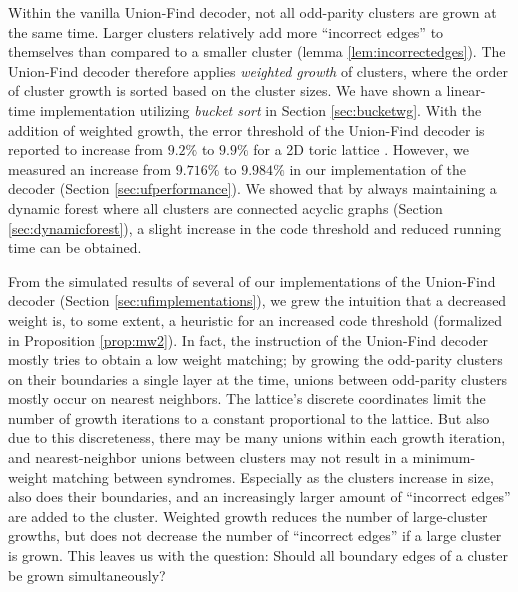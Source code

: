 Within the vanilla Union-Find decoder, not all odd-parity clusters are grown at the same time. Larger clusters relatively add more ``incorrect edges'' to themselves than compared to a smaller cluster (lemma \ref{lem:incorrectedges}). The Union-Find decoder therefore applies \emph{weighted growth} of clusters, where the order of cluster growth is sorted based on the cluster sizes. We have shown a linear-time implementation utilizing \emph{bucket sort} in Section \ref{sec:bucketwg}. With the addition of weighted growth, the error threshold of the Union-Find decoder is reported to increase from $9.2\%$ to $9.9\%$ for a 2D toric lattice \cite{delfosse2017almost}. However, we measured an increase from $9.716\%$ to $9.984\%$ in our implementation of the decoder (Section \ref{sec:ufperformance}). We showed that by always maintaining a dynamic forest where all clusters are connected acyclic graphs (Section \ref{sec:dynamicforest}), a slight increase in the code threshold and reduced running time can be obtained. 

From the simulated results of several of our implementations of the Union-Find decoder (Section \ref{sec:ufimplementations}), we grew the intuition that a decreased weight is, to some extent, a heuristic for an increased code threshold (formalized in Proposition \ref{prop:mw2}). In fact, the instruction of the Union-Find decoder mostly tries to obtain a low weight matching; by growing the odd-parity clusters on their boundaries a single layer at the time, unions between odd-parity clusters mostly occur on nearest neighbors. The lattice's discrete coordinates limit the number of growth iterations to a constant proportional to the lattice. But also due to this discreteness, there may be many unions within each growth iteration, and nearest-neighbor unions between clusters may not result in a minimum-weight matching between syndromes. Especially as the clusters increase in size, also does their boundaries, and an increasingly larger amount of ``incorrect edges'' are added to the cluster. Weighted growth reduces the number of large-cluster growths, but does not decrease the number of ``incorrect edges'' if a large cluster is grown. This leaves us with the question: Should all boundary edges of a cluster be grown simultaneously?

